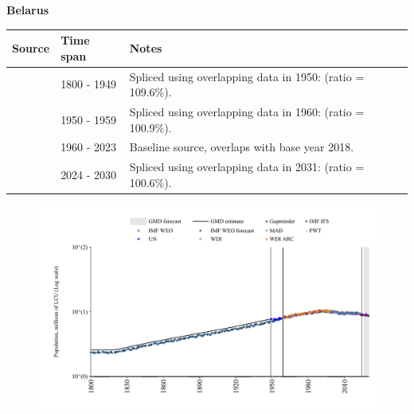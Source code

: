 \documentclass[12pt,a4paper,landscape]{article}
\begin{document}
\begin{adjustbox}{max totalsize={\paperwidth}{\paperheight},center}
\begin{minipage}[t][\textheight][t]{\textwidth}
\vspace*{0.5cm}
{}
\begin{center}
{\Large\bfseries Belarus}
\end{center}
\vspace{0.5cm}
\begin{table}[H]
\centering
\small
\begin{tabular}{|l|l|l|}
\hline
\textbf{Source} & \textbf{Time span} & \textbf{Notes} \\
\hline
\rowcolor{white}\cite{Gapminder}& 1800 - 1949 &Spliced using overlapping data in 1950: (ratio = 109.6\%).\\
\rowcolor{lightgray}\cite{IMF_IFS}& 1950 - 1959 &Spliced using overlapping data in 1960: (ratio = 100.9\%).\\
\rowcolor{white}\cite{WDI}& 1960 - 2023 &Baseline source, overlaps with base year 2018.\\
\rowcolor{lightgray}\cite{Gapminder}& 2024 - 2030 &Spliced using overlapping data in 2031: (ratio = 100.6\%).\\
\hline
\end{tabular}
\end{table}
\begin{figure}[H]
\centering
\includegraphics[width=\textwidth,height=0.6\textheight,keepaspectratio]{graphs/BLR_pop.pdf}
\end{figure}
\end{minipage}
\end{adjustbox}
\end{document}
